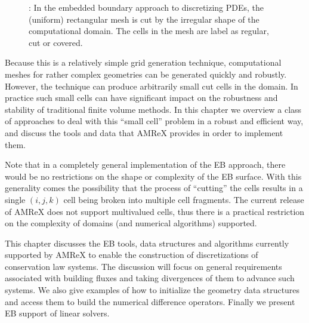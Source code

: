 \documentclass[letterpaper,10pt,english]{sphinxmanual}
\begin{document}
\begin{center}

\begin{figure}[htbp]
\centering
\capstart

\noindent{}
\caption{: In the embedded boundary approach to discretizing PDEs, the (uniform)
rectangular mesh is cut by the irregular shape of the computational domain.
The cells in the mesh are label as regular, cut or covered.}\label{\detokenize{EB:id1}}\label{\detokenize{EB:fig-ebexample}}\end{figure}

\end{center}

\sphinxAtStartPar
Because this is a relatively simple grid generation technique, computational
meshes for rather complex geometries can be generated quickly and robustly.
However, the technique can produce arbitrarily small cut cells in the domain.
In practice such small cells can have significant impact on the robustness and
stability of traditional finite volume methods. In this chapter we overview a
class of approaches to deal with this “small cell” problem in a robust and
efficient way, and discuss the tools and data that AMReX provides in order to
implement them.

\sphinxAtStartPar
Note that in a completely general implementation of the EB approach, there
would be no restrictions on the shape or complexity of the EB surface.  With
this generality comes the possibility that the process of “cutting” the cells
results in a single \((i,j,k)\) cell being broken into multiple cell
fragments.  The current release of AMReX does not support multi\sphinxhyphen{}valued cells,
thus there is a practical restriction on the complexity of domains (and
numerical algorithms) supported.

\sphinxAtStartPar
This chapter discusses the EB tools, data structures and algorithms currently
supported by AMReX to enable the construction of discretizations of
conservation law systems. The discussion will focus on general requirements
associated with building fluxes and taking divergences of them to advance such
systems. We also give examples of how to initialize the geometry data
structures and access them to build the numerical difference
operators.  Finally we present EB support of linear solvers.
\end{document}
